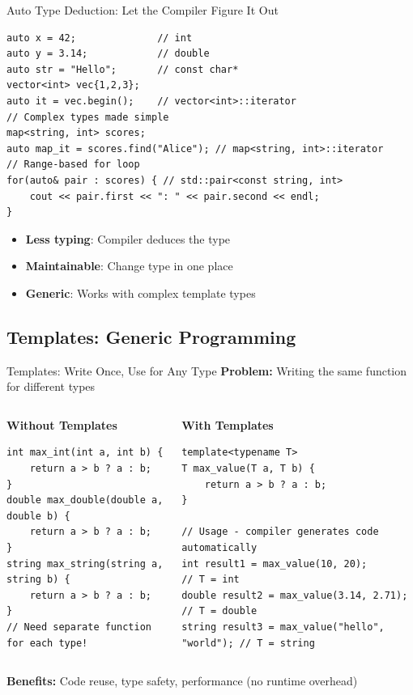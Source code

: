\begin{frame}[fragile]{Auto Type Deduction: Let the Compiler Figure It Out}
			\begin{verbatim}
auto x = 42;              // int
auto y = 3.14;            // double
auto str = "Hello";       // const char*
vector<int> vec{1,2,3};
auto it = vec.begin();    // vector<int>::iterator
// Complex types made simple
map<string, int> scores;
auto map_it = scores.find("Alice"); // map<string, int>::iterator
// Range-based for loop
for(auto& pair : scores) { // std::pair<const string, int>
    cout << pair.first << ": " << pair.second << endl;
}
			\end{verbatim}
	\begin{itemize}
		\item \textbf{Less typing}: Compiler deduces the type
		\item \textbf{Maintainable}: Change type in one place
		\item \textbf{Generic}: Works with complex template types
	\end{itemize}
\end{frame}

\subsection{Templates: Generic Programming}

\begin{frame}[fragile]{Templates: Write Once, Use for Any Type}
    \textbf{Problem:} Writing the same function for different types
    \begin{columns}
        \begin{column}{0.5\textwidth}
            \textbf{Without Templates}
            \begin{verbatim}
int max_int(int a, int b) {
    return a > b ? a : b;
}
double max_double(double a, double b) {
    return a > b ? a : b;
}
string max_string(string a, string b) {
    return a > b ? a : b;
}
// Need separate function for each type!
            \end{verbatim}
        \end{column}
        \begin{column}{0.5\textwidth}
            \textbf{With Templates}
            \begin{verbatim}
template<typename T>
T max_value(T a, T b) {
    return a > b ? a : b;
}

// Usage - compiler generates code automatically
int result1 = max_value(10, 20);        // T = int
double result2 = max_value(3.14, 2.71); // T = double
string result3 = max_value("hello", "world"); // T = string
            \end{verbatim}
        \end{column}
    \end{columns}

    \textbf{Benefits:} Code reuse, type safety, performance (no runtime overhead)
\end{frame}


